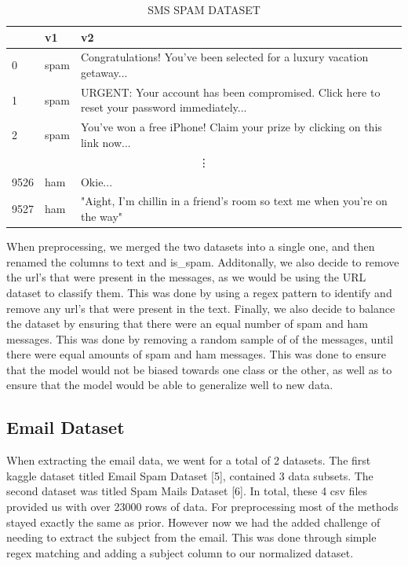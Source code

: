 \documentclass{article}
\begin{document}
\begin{table}[htbp]
    \centering
    \caption{SMS SPAM DATASET}
    \begin{tabular}{lll}
    \toprule
     & v1 & v2 \\
    \midrule
    0 & spam & Congratulations! You've been selected for a luxury vacation getaway... \\
    1 & spam & URGENT: Your account has been compromised. Click here to reset your password immediately... \\
    2 & spam & You've won a free iPhone! Claim your prize by clicking on this link now... \\
    \multicolumn{3}{c}{\vdots} \\ %
    9526 & ham & Okie... \\
    9527 & ham & "Aight, I'm chillin in a friend's room so text me when you're on the way" \\
    \bottomrule
    \end{tabular}
    \label{tab:csv_sample}
\end{table}

When preprocessing, we merged the two datasets into a single one, and then renamed the columns to text and is\_spam. Additonally, we also decide to remove the url's that were present in the messages, as we would be using the URL dataset to classify them. This was done by using a regex pattern to identify and remove any url's that were present in the text. Finally, we also decide to balance the dataset by ensuring that there were an equal number of spam and ham messages. This was done by removing a random sample of of the messages, until there were equal amounts of spam and ham messages. This was done to ensure that the model would not be biased towards one class or the other, as well as to ensure that the model would be able to generalize well to new data.

\subsection*{Email Dataset}

When extracting the email data, we went for a total of 2 datasets. The first kaggle dataset titled Email Spam Dataset [5], contained 3 data subsets. The second dataset was titled Spam Mails Dataset [6]. In total, these 4 csv files provided us with over 23000 rows of data. 
\newline
\newline
\noindent
For preprocessing most of the methods stayed exactly the same as prior. However now we had the added challenge of needing to extract the subject from the email. This was done through simple regex matching and adding a subject column to our normalized dataset. 
\end{document}
